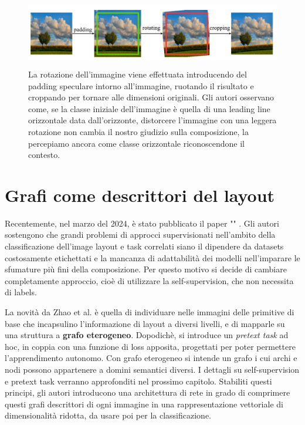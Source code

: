 \begin{figure}[!ht]
    \centering
    \includegraphics[height=30mm]{Immagini/sota/rotation_rstn.png}
    \caption{La rotazione dell'immagine viene effettuata introducendo del padding speculare intorno all'immagine, ruotando il risultato e croppando per tornare alle dimensioni originali. Gli autori osservano come, se la classe iniziale dell'immagine è quella di una leading line orizzontale data dall'orizzonte, distorcere l'immagine con una leggera rotazione non cambia il nostro giudizio sulla composizione, la percepiamo ancora come classe orizzontale riconoscendone il contesto.}
    \label{fig:rotation_rstn}
\end{figure}

\section{Grafi come descrittori del layout}
\label{graph}
Recentemente, nel marzo del 2024, è stato pubblicato il paper "\textit{}" \cite{graph}. Gli autori sostengono che grandi problemi di approcci supervisionati nell'ambito della classificazione dell'image layout e task correlati siano il dipendere da datasets costosamente etichettati e la mancanza di adattabilità dei modelli nell'imparare le sfumature più fini della composizione. Per questo motivo si decide di cambiare completamente approccio, cioè di utilizzare la self-supervision, che non necessita di labels. 

La novità da Zhao et al. è quella di individuare nelle immagini delle primitive di base che incapsulino l'informazione di layout a diversi livelli, e di mapparle su una struttura a \textbf{grafo eterogeneo}. Dopodichè, si introduce un \textit{pretext task} ad hoc, in coppia con una funzione di loss apposita, progettati per poter permettere l'apprendimento autonomo. 
Con grafo eterogeneo si intende un grafo i cui archi e nodi possono appartenere a domini semantici diversi. I dettagli su self-supervision e pretext task verranno approfonditi nel prossimo capitolo. Stabiliti questi principi, gli autori introducono una architettura di rete in grado di comprimere questi grafi descrittori di ogni immagine in una rappresentazione vettoriale di dimensionalità ridotta, da usare poi per la classificazione.

